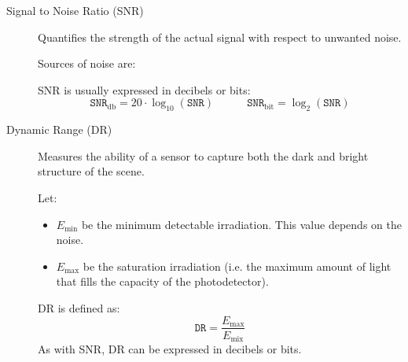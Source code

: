 \begin{description}
    \item[Signal to Noise Ratio (SNR)] 
        Quantifies the strength of the actual signal with respect to unwanted noise.

        Sources of noise are:

        SNR is usually expressed in decibels or bits:
        \[ \texttt{SNR}_\text{db} = 20 \cdot \log_{10}(\texttt{SNR}) \hspace{3em} \texttt{SNR}_\text{bit} = \log_{2}(\texttt{SNR}) \]

    \item[Dynamic Range (DR)] 
        Measures the ability of a sensor to capture both the dark and bright structure of the scene.

        Let:
        \begin{itemize}
            \item $E_\text{min}$ be the minimum detectable irradiation. This value depends on the noise.
            \item $E_\text{max}$ be the saturation irradiation (i.e. the maximum amount of light that fills the capacity of the photodetector).
        \end{itemize}
        DR is defined as:
        \[ \texttt{DR} = \frac{E_\text{max}}{E_\text{mix}} \]
        As with SNR, DR can be expressed in decibels or bits.
\end{description}